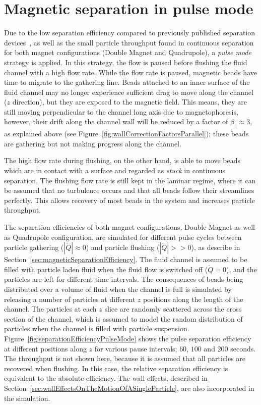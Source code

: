 \section{Magnetic separation in pulse mode}
\label{sec:pulseModeMagneticSeparationEfficiency}
Due to the low separation efficiency compared to previously published separation devices~\cite{Pratt2011}, as well as the small particle throughput found in continuous separation for both magnet configurations (Double Magnet and Quadrupole), a \textit{pulse mode} strategy is applied. In this strategy, the flow is paused before flushing the fluid channel with a high flow rate. While the flow rate is paused, magnetic beads have time to migrate to the gathering line. Beads attached to an inner surface of the fluid channel may no longer experience sufficient drag to move along the channel ($z$ direction), but they are exposed to the magnetic field. This means, they are still moving perpendicular to the channel long axis due to magnetophoresis, however, their drift along the channel wall will be reduced by a factor of $\beta_{\parallel} \approx 3$, as explained above (see Figure~\ref{fig:wallCorrectionFactorsParallel}); these beads are gathering but not making progress along the channel. 

The high flow rate during flushing, on the other hand, is able to move beads which are in contact with a surface and regarded as \textit{stuck} in continuous separation. The flushing flow rate is still kept in the laminar regime, where it can be assumed that no turbulence occurs and that all beads follow their streamlines perfectly. This allows recovery of most beads in the system and increases particle throughput.

The separation efficiencies of both magnet configurations, Double Magnet as well as Quadrupole configuration, are simulated for different pulse cycles between particle gathering ($|\dot{Q}| \approx 0$) and particle flushing ($|\dot{Q}| >> 0$), as describe in Section~\ref{sec:magneticSeparationEfficiency}. The fluid channel is assumed to be filled with particle laden fluid when the fluid flow is switched off ($\dot{Q}=0$), and the particles are left for different time intervals. The consequences of beads being distributed over a volume of fluid when the channel is full is simulated by releasing a number of particles at different $z$ positions along the length of the channel. The particles at each $z$ slice are randomly scattered across the cross section of the channel, which is assumed to model the random distribution of particles when the channel is filled with particle suspension. Figure~\ref{fig:separationEfficiencyPulseMode} shows the pulse separation efficiency at different positions along $z$ for various pause intervals; $60$, $100$ and $200$ seconds. The throughput is not shown here, because it is assumed that all particles are recovered when flushing. In this case, the relative separation efficiency is equivalent to the absolute efficiency. The wall effects, described in Section~\ref{sec:wallEffectsOnTheMotionOfASingleParticle}, are also incorporated in the simulation. 

